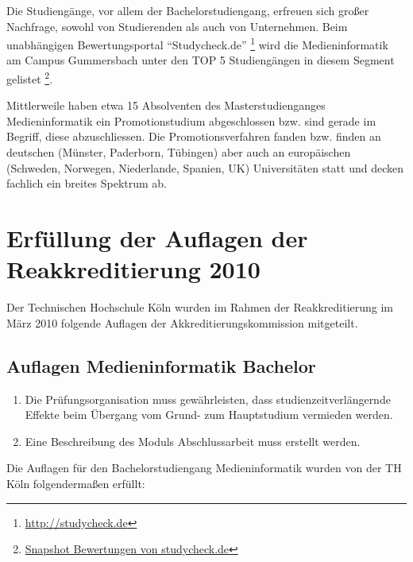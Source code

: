 Die Studiengänge, vor allem der Bachelorstudiengang, erfreuen sich
großer Nachfrage, sowohl von Studierenden als auch von Unternehmen. Beim
unabhängigen Bewertungsportal ``Studycheck.de'' \footnote{\url{http://studycheck.de}}
wird die Medieninformatik am Campus Gummersbach unter den TOP 5
Studiengängen in diesem Segment gelistet \footnote{\href{https://th-koeln.github.io/mi-2017/anhaenge/eva-snapshot_2017_02_17_bewertungen_studiengang_medieninformatik_auf_studycheck_._de.pdf}{Snapshot
  Bewertungen von studycheck.de}}.

Mittlerweile haben etwa 15 Absolventen des Masterstudienganges
Medieninformatik ein Promotionstudium abgeschlossen bzw. sind gerade im
Begriff, diese abzuschliessen. Die Promotionsverfahren fanden bzw.
finden an deutschen (Münster, Paderborn, Tübingen) aber auch an
europäischen (Schweden, Norwegen, Niederlande, Spanien, UK)
Universitäten statt und decken fachlich ein breites Spektrum ab.

\section{Erfüllung der Auflagen der Reakkreditierung
2010}\label{erfuxfcllung-der-auflagen-der-reakkreditierung-2010}

Der Technischen Hochschule Köln wurden im Rahmen der Reakkreditierung im
März 2010 folgende Auflagen der Akkreditierungskommission mitgeteilt.

\subsection{Auflagen Medieninformatik
Bachelor}\label{auflagen-medieninformatik-bachelor}

\begin{siderules}
\begin{enumerate}
\def\labelenumi{\arabic{enumi}.}
\tightlist
\item
  Die Prüfungsorganisation muss gewährleisten, dass
  studienzeitverlängernde Effekte beim Übergang vom Grund- zum
  Hauptstudium vermieden werden.
\item
  Eine Beschreibung des Moduls Abschlussarbeit muss erstellt werden.
\end{enumerate}
\end{siderules}

Die Auflagen für den Bachelorstudiengang Medieninformatik wurden von der
TH Köln folgendermaßen erfüllt:

